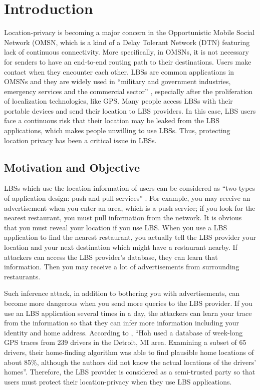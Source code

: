 \chapter {Introduction}
\label{INTRO}
Location-privacy is becoming a major concern in the Opportunistic Mobile Social Network (OMSN, which is a kind of a Delay Tolerant Network (DTN) \cite {C1} featuring lack of continuous connectivity. More specifically, in OMSNs, it is not necessary for senders to have an end-to-end routing path to their destinations. Users make contact when they encounter each other. LBSs are common applications in OMSNs and they are widely used in ``military and government industries, emergency services and the commercial sector'' \cite{C4}, especially after the proliferation of localization technologies, like GPS. Many people access LBSs with their portable devices and send their location to LBS providers. In this case, LBS users face a continuous risk that their location may be leaked from the LBS applications, which makes people unwilling to use LBSs. Thus, protecting location privacy has been a critical issue in LBSs.


\section{Motivation and Objective}
LBSs which use the location information of users can be considered as ``two types of application design: push and pull services'' \cite {C4}. For example, you may receive an advertisement when you enter an area, which is a push service; if you look for the nearest restaurant, you must pull information from the network. It is obvious that you must reveal your location if you use LBS. When you use a LBS application to find the nearest restaurant, you actually tell the LBS provider your location and your next destination which might have a restaurant nearby. If attackers can access the LBS provider's database, they can learn that information. Then you may receive a lot of advertisements from surrounding restaurants.

Such inference attack, in addition to bothering you with advertisements, can become more dangerous when you send more queries to the LBS provider. If you use an LBS application several times in a day, the attackers can learn your trace from the information so that they can infer more information including your identity and home address. According to \cite {C5}, ``Hoh used a database of week-long GPS traces from 239 drivers in the Detroit, MI area. Examining a subset of 65 drivers, their home-finding algorithm was able to find plausible home locations of about 85\%, although the authors did not know the actual locations of the drivers' homes''. Therefore, the LBS provider is considered as a semi-trusted party so that users must protect their location-privacy when they use LBS applications.

